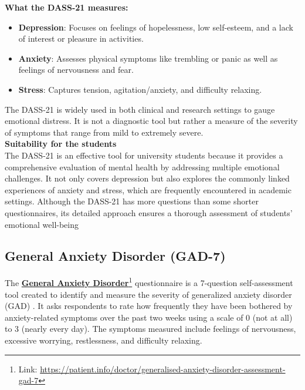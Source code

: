 \noindent \textbf{What the DASS-21 measures:}
\begin{itemize}
    \item \textbf{Depression}: Focuses on feelings of hopelessness, low self-esteem, and a lack of interest or pleasure in activities.
    \item \textbf{Anxiety}: Assesses physical symptoms like trembling or panic as well as feelings of nervousness and fear.
    \item \textbf{Stress}: Captures tension, agitation/anxiety, and difficulty relaxing.
\end{itemize}
The DASS-21 is widely used in both clinical and research settings to gauge emotional distress. It is not a diagnostic tool but rather a measure of the severity of symptoms that range from mild to extremely severe.\vspace{5mm} \\
\textbf{Suitability for the students} \\
The DASS-21 is an effective tool for university students because it provides a comprehensive evaluation of mental health by addressing multiple emotional challenges. It not only covers depression but also explores the commonly linked experiences of anxiety and stress, which are frequently encountered in academic settings. Although the DASS-21 has more questions than some shorter questionnaires, its detailed approach ensures a thorough assessment of students' emotional well-being

\subsection{General Anxiety Disorder (GAD-7)}

The \textbf{\href{https://patient.info/doctor/generalised-anxiety-disorder-assessment-gad-7}{General Anxiety Disorder}}\footnote{Link: \url{https://patient.info/doctor/generalised-anxiety-disorder-assessment-gad-7}} questionnaire is a 7-question self-assessment tool created to identify and measure the severity of generalized anxiety disorder (GAD) \cite{gad-review}. It asks respondents to rate how frequently they have been bothered by anxiety-related symptoms over the past two weeks using a scale of 0 (not at all) to 3 (nearly every day). The symptoms measured include feelings of nervousness, excessive worrying, restlessness, and difficulty relaxing.\vspace{5mm}

